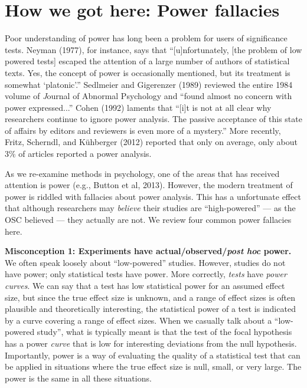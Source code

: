 \documentclass[doc,a4paper,floatsintext,draftfirst]{apa6}
\begin{document}
\section{How we got here: Power fallacies}
Poor understanding of power has long been a problem for users of significance tests. Neyman (1977), for instance, says that ``[u]nfortunately, [the problem of low powered tests] escaped the attention of a large number of authors of statistical texts. Yes, the concept of power is occasionally mentioned, but its treatment is somewhat `platonic'.'' Sedlmeier and Gigerenzer (1989) reviewed the entire 1984 volume of {\textit Journal of Abnormal Psychology} and ``found almost no concern with power expressed...'' Cohen (1992) laments that ``[i]t is not at all clear why researchers continue to ignore power analysis. The passive acceptance of this state of affairs by editors and reviewers is even more of a mystery.'' More recently, Fritz, Scherndl, and K\"{u}hberger (2012) reported that only on average, only about 3\% of articles reported a power analysis.

\nocite{Cohen:1992,Neyman:1977,Fritz:etal:2013,Sedlmeier:Gigerenzer:1989}

As we re-examine methods in psychology, one of the areas that has received attention is power (e.g., Button et al, 2013). However, the modern treatment of power is riddled with fallacies about power analysis. This has a unfortunate effect that although researchers may {\em believe} their studies are ``high-powered'' --- as the OSC believed --- they actually are not. We review four common power fallacies here.

\nocite{Button:etal:2013}

{\bf Misconception 1: Experiments have actual/observed/{\em post hoc} power.} We often speak loosely about ``low-powered'' studies. However, studies do not have power; only statistical tests have power. More correctly, {\em tests} have {\em power curves}. We can say that a test has low statistical power for an assumed effect size, but since the true effect size is unknown, and a range of effect sizes is often plausible and theoretically interesting, the statistical power of a test is indicated by a curve covering a range of effect sizes. When we casually talk about a ``low-powered study'',  what is typically meant is that the test of the focal hypothesis has a power {\em curve} that is low for interesting deviations from the null hypothesis. Importantly, power is a way of evaluating the quality of a statistical test that can be applied in situations where the true effect size is null, small, or very large. The power is the same in all these situations.
\end{document}
